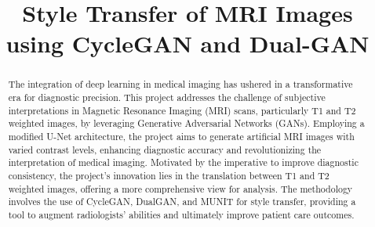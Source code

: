 \documentclass[conference]{IEEEtran}
\begin{document}
\title{Style Transfer of MRI Images using CycleGAN and Dual-GAN}
\author{
\and
{}
\and
{}
\and
{}
\and
{}
\and
{}
}


\maketitle

\begin{abstract}
The integration of deep learning in medical imaging has ushered in a transformative era for diagnostic precision. This project addresses the challenge of subjective interpretations in Magnetic Resonance Imaging (MRI) scans, particularly T1 and T2 weighted images, by leveraging Generative Adversarial Networks (GANs). Employing a modified U-Net architecture, the project aims to generate artificial MRI images with varied contrast levels, enhancing diagnostic accuracy and revolutionizing the interpretation of medical imaging. Motivated by the imperative to improve diagnostic consistency, the project's innovation lies in the translation between T1 and T2 weighted images, offering a more comprehensive view for analysis. The methodology involves the use of CycleGAN, DualGAN, and MUNIT for style transfer, providing a tool to augment radiologists' abilities and ultimately improve patient care outcomes.
\end{abstract}
\end{document}
